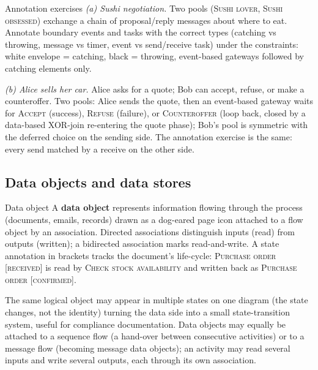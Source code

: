 \begin{examplebox}{Annotation exercises}
\emph{(a) Sushi negotiation.} Two pools (\textsc{Sushi lover}, \textsc{Sushi obsessed}) exchange a chain of proposal/reply messages about where to eat. Annotate boundary events and tasks with the correct types (catching vs throwing, message vs timer, event vs send/receive task) under the constraints: white envelope = catching, black = throwing, event-based gateways followed by catching elements only.
\par\smallskip
\emph{(b) Alice sells her car.} Alice asks for a quote; Bob can accept, refuse, or make a counteroffer. Two pools: Alice sends the quote, then an event-based gateway waits for \textsc{Accept} (success), \textsc{Refuse} (failure), or \textsc{Counteroffer} (loop back, closed by a data-based XOR-join re-entering the quote phase); Bob's pool is symmetric with the deferred choice on the sending side. The annotation exercise is the same: every send matched by a receive on the other side.
\end{examplebox}

\subsection{Data objects and data stores}

\begin{definitionbox}{Data object}
A \textbf{data object} represents information flowing through the process (documents, emails, records) drawn as a dog-eared page icon attached to a flow object by an association. Directed associations distinguish inputs (read) from outputs (written); a bidirected association marks read-and-write. A state annotation in brackets tracks the document's life-cycle: \textsc{Purchase order [received]} is read by \textsc{Check stock availability} and written back as \textsc{Purchase order [confirmed]}.
\end{definitionbox}

The same logical object may appear in multiple states on one diagram (the state changes, not the identity) turning the data side into a small state-transition system, useful for compliance documentation. Data objects may equally be attached to a sequence flow (a hand-over between consecutive activities) or to a message flow (becoming message data objects); an activity may read several inputs and write several outputs, each through its own association.

